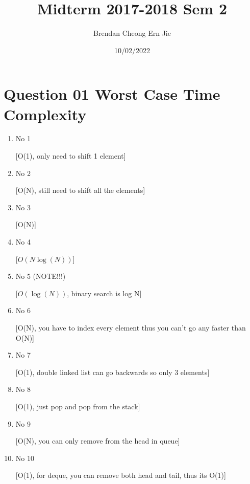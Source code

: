 \documentclass{article}
\title{Midterm 2017-2018 Sem 2}
\author{Brendan Cheong Ern Jie}
\date {10/02/2022}
\begin{document}
\maketitle

\section{Question 01 Worst Case Time Complexity}
\begin{enumerate}[label=(\arabic*)]

\item No 1

[O(1), only need to shift 1 element]

\item No 2

[O(N), still need to shift all the elements]

\item No 3

[O(N)]

\item No 4

[$O(N\log(N))$]

\item No 5 (NOTE!!!)

[$O(\log(N))$, binary search is log N]

\item No 6

[O(N), you have to index every element thus you can't go any faster than O(N)]

\item No 7

[O(1), double linked list can go backwards so only 3 elements]

\item No 8

[O(1), just pop and pop from the stack]

\item No 9

[O(N), you can only remove from the head in queue]

\item No 10

[O(1), for deque, you can remove both head and tail, thus its O(1)]

\end{enumerate}
\end{document}
